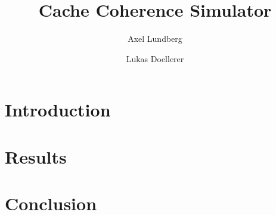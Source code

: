 \documentclass[a4paper]{article}
\title{Cache Coherence Simulator}
\author{Axel Lundberg \and Lukas Doellerer}
\date{}
\begin{document}

\maketitle
\tableofcontents

\newpage
\section{Introduction}


\section{Results}


\section{Conclusion}



\end{document}
